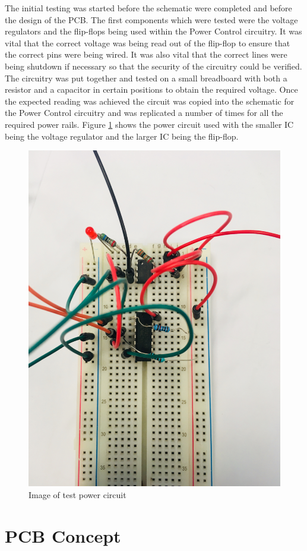 The initial testing was started before the schematic were completed and before the design of the PCB. The first components which were tested were the voltage regulators and the flip-flops being used within the Power Control circuitry. It was vital that the correct voltage was being read out of the flip-flop to ensure that the correct pins were being wired. It was also vital that the correct lines were being shutdown if necessary so that the security of the circuitry could be verified. The circuitry was put together and tested on a small breadboard with both a resistor and a capacitor in certain positions to obtain the required voltage. Once the expected reading was achieved the circuit was copied into the schematic for the Power Control circuitry and was replicated a number of times for all the required power rails. Figure \ref{fig:power_circuit} shows the power circuit used with the smaller IC being the voltage regulator and the larger IC being the flip-flop.

\begin{figure}
	\includegraphics[width=0.5\linewidth]{Figures/powercircuit.jpg}\centering
	\caption{Image of test power circuit}
	\label{fig:power_circuit}
\end{figure}



\section{PCB Concept}
\label{chap6sec3}

